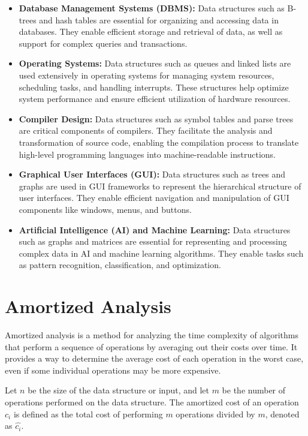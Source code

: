 \documentclass[12pt]{book} %
\begin{document}
\begin{itemize}
    \item \textbf{Database Management Systems (DBMS):} Data structures such as B-trees and hash tables are essential for organizing and accessing data in databases. They enable efficient storage and retrieval of data, as well as support for complex queries and transactions.
    
    \item \textbf{Operating Systems:} Data structures such as queues and linked lists are used extensively in operating systems for managing system resources, scheduling tasks, and handling interrupts. These structures help optimize system performance and ensure efficient utilization of hardware resources.
    
    \item \textbf{Compiler Design:} Data structures such as symbol tables and parse trees are critical components of compilers. They facilitate the analysis and transformation of source code, enabling the compilation process to translate high-level programming languages into machine-readable instructions.
    
    \item \textbf{Graphical User Interfaces (GUI):} Data structures such as trees and graphs are used in GUI frameworks to represent the hierarchical structure of user interfaces. They enable efficient navigation and manipulation of GUI components like windows, menus, and buttons.
    
    \item \textbf{Artificial Intelligence (AI) and Machine Learning:} Data structures such as graphs and matrices are essential for representing and processing complex data in AI and machine learning algorithms. They enable tasks such as pattern recognition, classification, and optimization.
\end{itemize}


\section{Amortized Analysis}
Amortized analysis is a method for analyzing the time complexity of algorithms that perform a sequence of operations by averaging out their costs over time. It provides a way to determine the average cost of each operation in the worst case, even if some individual operations may be more expensive. 

Let \(n\) be the size of the data structure or input, and let \(m\) be the number of operations performed on the data structure. The amortized cost of an operation \(c_i\) is defined as the total cost of performing \(m\) operations divided by \(m\), denoted as \(\hat{c_i}\).
\end{document}
